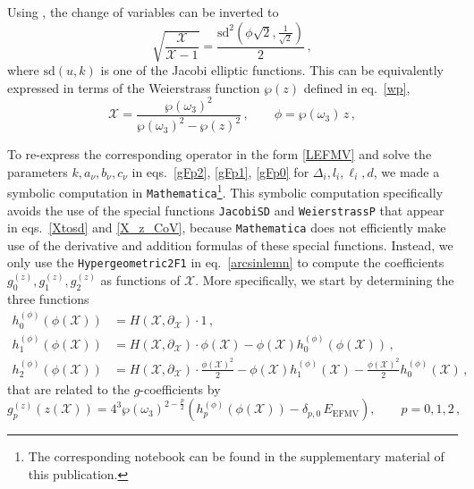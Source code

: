 \documentclass{article}
\def \om {\omega}
\def \Dg {\Delta}
\def \ds {\partial}
\begin{document}
Using \cite[Eq.~21]{lemniscate}, the change of variables can be inverted to 
\begin{equation}
\sqrt{\frac{\mathcal{X}}{\mathcal{X}-1}} =  \frac{\mathrm{sd}^2 \left( \phi \sqrt{2}, \frac{1}{\sqrt{2}} \right)}{2}\,, 
\label{Xtosd}
\end{equation}
where $\mathrm{sd}(u,k)$ is one of the Jacobi elliptic functions. This can be equivalently expressed in terms of the Weierstrass function $\wp(z)$ defined in eq.\ \eqref{wp}, 
\begin{equation}
\mathcal{X} = \frac{\wp(\om_3)^2}{\wp(\om_3)^2- \wp(z)^2}\,, \qquad \phi = \wp(\om_3) \, z\,, 
\label{X_z_CoV}
\end{equation}

To re-express the corresponding operator in the form \eqref{LEFMV} and solve the parameters $k,a_{\nu},b_{\nu},c_{\nu}$ in eqs.\  \eqref{gFp2}, \eqref{gFp1}, \eqref{gFp0} for $\Dg_i,l_i,\ell_i,d$, we made a symbolic computation in \texttt{Mathematica}\footnote{The corresponding notebook can be found in the supplementary material of this publication.}. This symbolic computation specifically avoids the use of the special functions \texttt{JacobiSD} and \texttt{WeierstrassP} that appear in eqs.\ \eqref{Xtosd} and \eqref{X_z_CoV}, because \texttt{Mathematica} does not efficiently make use of the derivative and addition formulas of these special functions. Instead, we only use the \texttt{Hypergeometric2F1} in eq.\ \eqref{arcsinlemn} to compute the coefficients $g_0^{(z)},g_1^{(z)},g_2^{(z)}$ as functions of $\mathcal{X}$. More specifically, we start by determining the three functions
\begin{align*}
h_0^{(\phi)}(\phi(\mathcal{X})) &= H(\mathcal{X},\ds_{\mathcal{X}}) \cdot 1\,, \\
h_1^{(\phi)}(\phi(\mathcal{X})) &= H(\mathcal{X},\ds_{\mathcal{X}}) \cdot \phi(\mathcal{X}) - \phi(\mathcal{X}) h^{(\phi)}_0(\phi(\mathcal{X}))\,, \\
h_2^{(\phi)}(\phi(\mathcal{X})) &= H(\mathcal{X},\ds_{\mathcal{X}}) \cdot \frac{\phi(\mathcal{X})^2}{2} - \phi(\mathcal{X}) h_1^{(\phi)}(\mathcal{X}) - \frac{\phi(\mathcal{X})^2}{2} h^{(\phi)}_0(\mathcal{X})\,,
\end{align*}
that are related to the $g$-coefficients by
\begin{equation}
g_p^{(z)}(z(\mathcal{X})) =  4^3 \wp(\om_3)^{2- \frac{p}{2}}  \left( h_p^{(\phi)} \left( \phi \left( \mathcal{X} \right) \right) - \delta_{p,0}\,E_{\mathrm{EFMV}} \right), \qquad p=0,1,2\,,
\label{h_to_g}
\end{equation}
\end{document}
